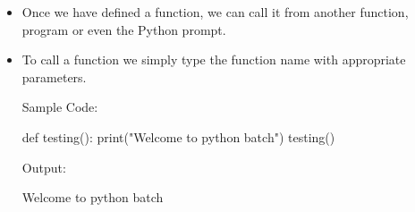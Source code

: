 \setlength{\columnsep}{3pt}
\begin{flushleft}
	
	\begin{itemize}
		\item Once we have defined a function, we can call it from another function,
		program or even the Python prompt. 
		\item To call a function we simply type the
function name with appropriate parameters.
		
		Sample Code:
		\begin{tcolorbox}[breakable,notitle,boxrule=-0pt,colback=black,colframe=black]
			\color{green}
			\font=9pt
			def testing(): \newline
			\hphantom{} \hphantom{} print("Welcome to python batch") \newline
			\newline
			testing()
			\font=4pt
		\end{tcolorbox}
		
		Output:
		\begin{tcolorbox}[breakable,notitle,boxrule=-0pt,colback=output,colframe=output]
			\color{black}
			Welcome to python batch
			\font=4pt
		\end{tcolorbox}
		
		
		
	\end{itemize}
	
\end{flushleft}

\newpage

